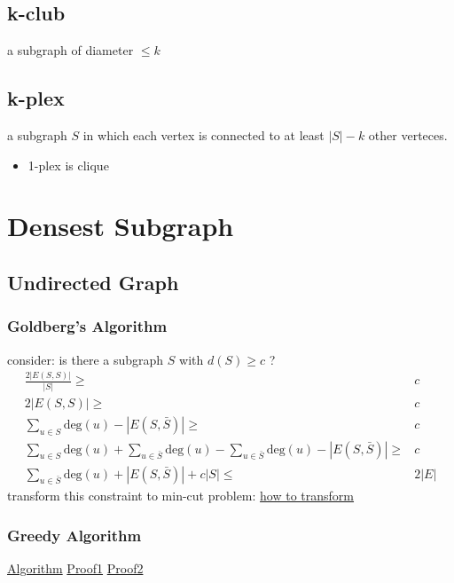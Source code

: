 \documentclass[11pt]{article}
\begin{document}
\subsection{k-club}
\label{sec:org1bc274e}
a subgraph of diameter \(\leq k\)
\subsection{k-plex}
\label{sec:orgd23db00}
a subgraph \(S\) in which each vertex is connected to at least \(|S|-k\) other verteces.
\begin{itemize}
\item 1-plex is clique
\end{itemize}

\section{Densest Subgraph}
\label{sec:org6dd0348}
\subsection{Undirected Graph}
\label{sec:orga68a195}
\subsubsection{Goldberg's Algorithm}
\label{sec:orga472e32}
consider: is there a subgraph \(S\) with \(d(S) \geq c\) ?
\begin{align}
    \frac{2|E(S,S)|}{|S|} \geq& c \\
    2|E(S,S)| \geq& c \\
    \sum_{u\in S} \mbox{deg}(u) - |E(S,\bar{S})| \geq& c \\
    \sum_{u\in S} \mbox{deg}(u) + \sum_{u\in\bar{S}} \mbox{deg}(u) - \sum_{u\in\bar{S}} \mbox{deg}(u) - |E(S,\bar{S})| \geq& c \\
    \sum_{u\in\bar{S}}\mbox{deg}(u) + |E(S,\bar{S})| + c|S| \leq& 2|E|
\end{align}
transform this constraint to min-cut problem:
\href{img/transform-to-cut.png}{how to transform}
\subsubsection{Greedy Algorithm}
\label{sec:orga49a616}
\href{img/greedy-for-denest-subgraph-1.pdf}{Algorithm}
\href{img/greedy-for-denest-subgraph-2.pdf}{Proof1}
\href{img/greedy-for-denest-subgraph-3.pdf}{Proof2}
\end{document}
